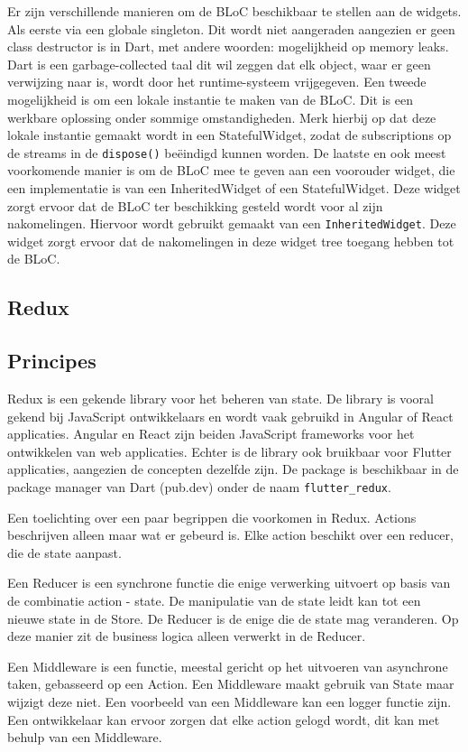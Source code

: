 Er zijn verschillende manieren om de BLoC beschikbaar te stellen aan de widgets. 
Als eerste via een globale singleton. Dit wordt niet aangeraden aangezien er geen class destructor is in Dart, met andere woorden: mogelijkheid op memory leaks. Dart is een garbage-collected taal dit wil zeggen dat elk object, waar er geen verwijzing naar is, wordt door het runtime-systeem vrijgegeven. 
Een tweede mogelijkheid is om een lokale instantie te maken van de BLoC. Dit is een werkbare oplossing onder sommige omstandigheden. Merk hierbij op dat deze lokale instantie gemaakt wordt in een StatefulWidget, zodat de subscriptions op de streams in de \verb|dispose()| beëindigd kunnen worden.
De laatste en ook meest voorkomende manier is om de BLoC mee te geven aan een voorouder widget, die een implementatie is van een InheritedWidget of een StatefulWidget. Deze widget zorgt ervoor dat de BLoC ter beschikking gesteld wordt voor al zijn nakomelingen. Hiervoor wordt gebruikt gemaakt van een \verb|InheritedWidget|. Deze widget zorgt ervoor dat de nakomelingen in deze widget tree toegang hebben tot de BLoC.

\subsection{Redux}
\label{ch:redux}
\subsection*{Principes}
Redux is een gekende library voor het beheren van state. De library is vooral gekend bij JavaScript ontwikkelaars en wordt vaak gebruikd in Angular of React applicaties. Angular en React zijn beiden JavaScript frameworks voor het ontwikkelen van web applicaties. Echter is de library ook bruikbaar voor Flutter applicaties, aangezien de concepten dezelfde zijn. De package is beschikbaar in de package manager van Dart (pub.dev) onder de naam \verb|flutter_redux|.

Een toelichting over een paar begrippen die voorkomen in Redux.
Actions beschrijven alleen maar wat er gebeurd is. Elke action beschikt over een reducer, die de state aanpast.

Een Reducer is een synchrone functie die enige verwerking uitvoert op basis van de combinatie action - state. De manipulatie van de state leidt kan tot een nieuwe state in de Store. De Reducer is de enige die de state mag veranderen. Op deze manier zit de business logica alleen verwerkt in de Reducer. 

Een Middleware is een functie, meestal gericht op het uitvoeren van asynchrone taken, gebasseerd op een Action. Een Middleware maakt gebruik van State maar wijzigt deze niet. Een voorbeeld van een Middleware kan een logger functie zijn. Een ontwikkelaar kan ervoor zorgen dat elke action gelogd wordt, dit kan met behulp van een Middleware.

